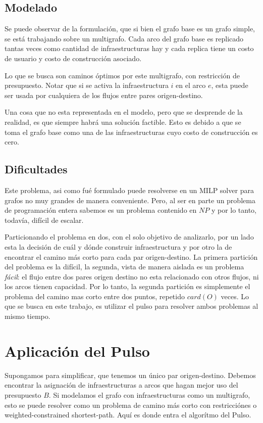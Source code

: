 \documentclass{article}
\begin{document}
  \subsection*{Modelado}

  Se puede observar de la formulación, que si bien el grafo base es un grafo simple, se está trabajando sobre un multigrafo. Cada arco del grafo base es replicado tantas veces como cantidad de infraestructuras hay y cada replica tiene un costo de usuario y costo de construcción asociado.

  Lo que se busca son caminos óptimos por este multigrafo, con restricción de presupuesto. Notar que si se activa la infraestructura $i$ en el arco $e$, esta puede ser usada por cualquiera de los flujos entre pares origen-destino.

  Una cosa que no esta representada en el modelo, pero que se desprende de la realidad, es que siempre habrá una solución factible. Esto es debido a que se toma el grafo base como una de las infraestructuras cuyo costo de construcción es cero.

  \subsection*{Dificultades}

  Este problema, asi como fué formulado puede resolverse en un MILP solver para grafos no muy grandes de manera conveniente. Pero, al ser en parte un problema de programación entera sabemos es un problema contenido en $NP$ y por lo tanto, todavía, difícil de escalar.

  Particionando el problema en dos, con el solo objetivo de analizarlo, por un lado esta la decisión de cuál y dónde construir infraestructura y por otro la de encontrar el camino más corto para cada par origen-destino. La primera partición del problema es la difícil, la segunda, vista de manera aislada es un problema {\it fácil}: el flujo entre dos pares origen destino no esta relacionado con otros flujos, ni los arcos tienen capacidad. Por lo tanto, la segunda partición es simplemente el problema del camino mas corto entre dos puntos, repetido $card(O)$ veces. Lo que se busca en este trabajo, es utilizar el pulso para resolver ambos problemas al mismo tiempo.

  \section*{Aplicación del Pulso}

  Supongamos para simplificar, que tenemos un único par origen-destino. Debemos encontrar la asignación de infraestructuras a arcos que hagan mejor uso del presupuesto $B$. Si modelamos el grafo con infraestructuras como un multigrafo, esto se puede resolver como un problema de camino más corto con restricciónes o weighted-constrained shortest-path. Aquí es donde entra el algorítmo del Pulso.
\end{document}
